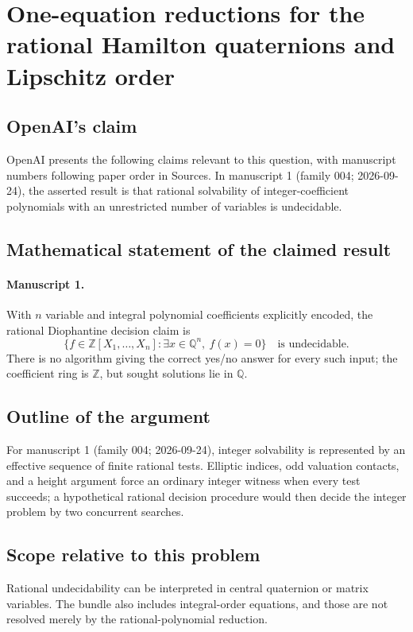 \documentclass[11pt]{article}
\begin{document}
\section*{One-equation reductions for the rational Hamilton quaternions and Lipschitz order}

\subsection{OpenAI's claim}
OpenAI presents the following claims relevant to this question, with manuscript numbers following paper order in Sources. In manuscript 1 (family 004; 2026-09-24), the asserted result is that rational solvability of integer-coefficient polynomials with an unrestricted number of variables is undecidable.

\subsection{Mathematical statement of the claimed result}
\paragraph{Manuscript 1.}
With $n$ variable and integral polynomial coefficients explicitly encoded, the rational Diophantine decision claim is
\[
 \{f\in\mathbb Z[X_1,\ldots,X_n]:\exists x\in\mathbb Q^n,\ f(x)=0\}
 \quad\text{is undecidable}.
\]
There is no algorithm giving the correct yes/no answer for every such input; the coefficient ring is $\mathbb Z$, but sought solutions lie in $\mathbb Q$.

\subsection{Outline of the argument}
For manuscript 1 (family 004; 2026-09-24), integer solvability is represented by an effective sequence of finite rational tests. Elliptic indices, odd valuation contacts, and a height argument force an ordinary integer witness when every test succeeds; a hypothetical rational decision procedure would then decide the integer problem by two concurrent searches.

\subsection{Scope relative to this problem}
Rational undecidability can be interpreted in central quaternion or matrix variables. The bundle also includes integral-order equations, and those are not resolved merely by the rational-polynomial reduction.
\end{document}
